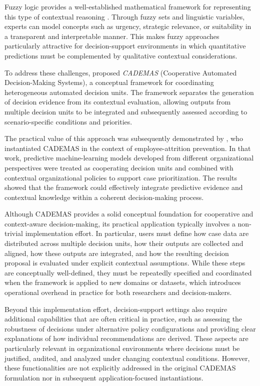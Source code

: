 \documentclass{interact}
\begin{document}
Fuzzy logic provides a well-established mathematical framework for representing this type of contextual reasoning \citep{PerezCanedo2023,Lamata2020}. Through fuzzy sets and linguistic variables, experts can model concepts such as urgency, strategic relevance, or suitability in a transparent and interpretable manner. This makes fuzzy approaches particularly attractive for decision-support environments in which quantitative predictions must be complemented by qualitative contextual considerations.

To address these challenges, \citet{NovoaHernandez2026} proposed \textit{CADEMAS} (Cooperative Automated Decision-Making Systems), a conceptual framework for coordinating heterogeneous automated decision units. The framework separates the generation of decision evidence from its contextual evaluation, allowing outputs from multiple decision units to be integrated and subsequently assessed according to scenario-specific conditions and priorities.

The practical value of this approach was subsequently demonstrated by \citet{Godz2026}, who instantiated CADEMAS in the context of employee-attrition prevention. In that work, predictive machine-learning models developed from different organizational perspectives were treated as cooperating decision units and combined with contextual organizational policies to support case prioritization. The results showed that the framework could effectively integrate predictive evidence and contextual knowledge within a coherent decision-making process.

Although CADEMAS provides a solid conceptual foundation for cooperative and context-aware decision-making, its practical application typically involves a non-trivial implementation effort. In particular, users must define how case data are distributed across multiple decision units, how their outputs are collected and aligned, how these outputs are integrated, and how the resulting decision proposal is evaluated under explicit contextual assumptions. While these steps are conceptually well-defined, they must be repeatedly specified and coordinated when the framework is applied to new domains or datasets, which introduces operational overhead in practice for both researchers and decision-makers.

Beyond this implementation effort, decision-support settings also require additional capabilities that are often critical in practice, such as assessing the robustness of decisions under alternative policy configurations and providing clear explanations of how individual recommendations are derived. These aspects are particularly relevant in organizational environments where decisions must be justified, audited, and analyzed under changing contextual conditions. However, these functionalities are not explicitly addressed in the original CADEMAS formulation nor in subsequent application-focused instantiations.
\end{document}
